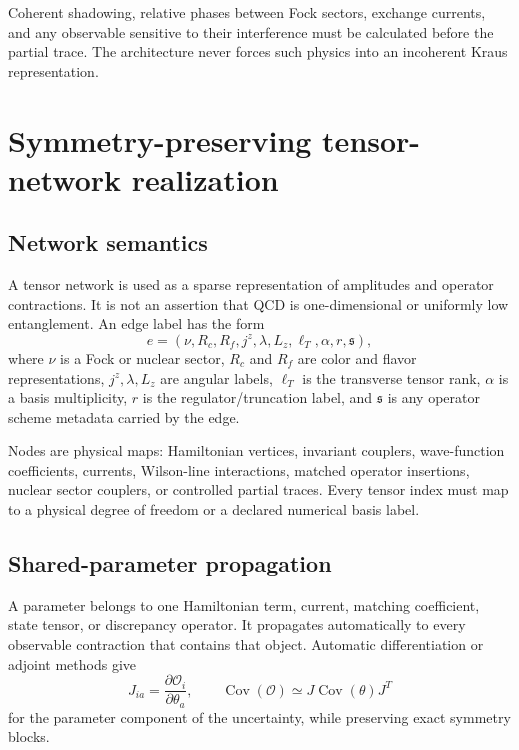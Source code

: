 \documentclass[11pt]{article}
\newcommand{\cO}{\mathcal O}
\begin{document}
Coherent shadowing, relative phases between Fock sectors, exchange currents,
and any observable sensitive to their interference must be calculated before
the partial trace.  The architecture never forces such physics into an
incoherent Kraus representation.

\section{Symmetry-preserving tensor-network realization}
\label{sec:tensor-network}

\subsection{Network semantics}

A tensor network is used as a sparse representation of amplitudes and
operator contractions.  It is not an assertion that QCD is one-dimensional
or uniformly low entanglement.  An edge label has the form
\begin{equation}
 e=(\nu,R_c,R_f,j^z,\lambda,L_z,\ell_T,\alpha,r,\mathfrak s),
\label{eq:tensor-edge-label}
\end{equation}
where \(\nu\) is a Fock or nuclear sector, \(R_c\) and \(R_f\) are color and
flavor representations, \(j^z,\lambda,L_z\) are angular labels, \(\ell_T\) is the transverse tensor rank,
\(\alpha\) is a basis multiplicity, \(r\) is the regulator/truncation label,
and \(\mathfrak s\) is any operator scheme metadata carried by the edge.

Nodes are physical maps: Hamiltonian vertices, invariant couplers,
wave-function coefficients, currents, Wilson-line interactions, matched
operator insertions, nuclear sector couplers, or controlled partial traces.
Every tensor index must map to a physical degree of freedom or a declared
numerical basis label.

\subsection{Shared-parameter propagation}

A parameter belongs to one Hamiltonian term, current, matching coefficient,
state tensor, or discrepancy operator.  It propagates automatically to every
observable contraction that contains that object.  Automatic differentiation
or adjoint methods give
\begin{equation}
 J_{ia}=\frac{\partial\cO_i}{\partial\theta_a},
 \qquad
 \operatorname{Cov}(\cO)
 \simeq J\operatorname{Cov}(\theta)J^T
\label{eq:autodiff-covariance}
\end{equation}
for the parameter component of the uncertainty, while preserving exact
symmetry blocks.
\end{document}
